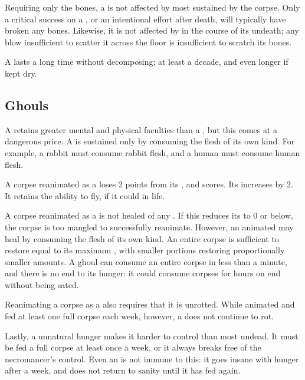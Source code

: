 Requiring only the bones, a  is not affected by most {\damage} sustained by the corpse.
Only a critical success on a {\damagetest}, or an intentional effort after death, will typically have broken any bones.
Likewise, it is not affected by {\damage} in the course of its undeath; any blow insufficient to scatter it across the floor is insufficient to scratch its bones.

A  lasts a long time without decomposing; at least a decade, and even longer if kept dry.

\subsection{Ghouls}

A  retains greater mental and physical faculties than a , but this comes at a dangerous price.
A  is sustained only by consuming the flesh of its own kind.
For example, a rabbit  must consume rabbit flesh, and a human  must consume human flesh.

A corpse reanimated as a  loses 2 points from its ,  and  scores.
Its  increases by 2.
It retains the ability to fly, if it could in life.

A corpse reanimated as a  is not healed of any {\damage}.
If this reduces its  to 0 or below, the corpse is too mangled to successfully reanimate.
However, an animated  may heal {\damage} by consuming the flesh of its own kind.
An entire corpse is sufficient to restore {\damage} equal to its maximum , with smaller portions restoring proportionally smaller amounts.
A ghoul can consume an entire corpse in less than a minute, and there is no end to its hunger: it could consume corpses for hours on end without being sated.

Reanimating a corpse as a  also requires that it is unrotted.
While animated and fed at least one full corpse each week, however, a  does not continue to rot.

Lastly, a  unnatural hunger makes it harder to control than most undead.
It must be fed a full corpse at least once a week, or it always breaks free of the necromancer's control.
Even an  is not immune to this: it goes insane with hunger after a week, and does not return to sanity until it has fed again.

